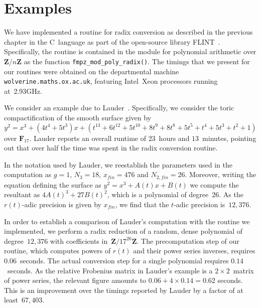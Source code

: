 
\chapter{Examples}

We have implemented a routine for radix conversion as described 
in the previous chapter in the C~language as part of the open-source 
library FLINT~\citep{FLINT}.  Specifically, the routine is contained 
in the module for polynomial arithmetic over $\mathbf{Z}/n\mathbf{Z}$ 
as the function {\tt{fmpz\_mod\_poly\_radix()}}.  The timings that we 
present for our routines were obtained on the departmental machine 
{\tt{wolverine.maths.ox.ac.uk}}, featuring \mbox{Intel Xeon} processors 
running at~2.93GHz.

We consider an example due to Lauder~\citep[Example~9.1]{Lauder2006}.  
Specifically, we consider the toric compactification of the smooth 
surface given by 
\begin{equation*}
y^2 = x^3 + (4 t^4 + 5 t^3) x + 
    (t^{13} + 6 t^{12} + 5 t^{10} + 
    8 t^9 + 8 t^8 + 5 t^5 + t^4 + 5 t^3 + t^2 + 1)
\end{equation*}
over $\mathbf{F}_{17}$.  Lauder reports an overall runtime 
of $23$~hours and $13$~minutes, pointing out that over half the 
time was spent in the radix conversion routine.

In the notation used by Lauder, we reestablish the parameters used 
in the computation as $g = 1$, $N_3 = 18$, $x_{fin} = 476$ and 
$N_{2,fin} = 26$.  Moreover, writing the equation defining the surface 
as $y^2 = x^3 + A(t) x + B(t)$ we compute the resultant as 
$4 A(t)^3 + 27 B(t)^2$, which is a polynomial of degree~$26$.  As the 
$r(t)$-adic precision is given by $x_{fin}$, we find that the $t$-adic 
precision is~$12,376$.

In order to establish a comparison of Lauder's computation with the 
routine we implemented, we perform a radix reduction of a random, 
dense polynomial of degree~$12,376$ with coefficients 
in~$\mathbf{Z}/17^{26} \mathbf{Z}$.  The precomputation step of our 
routine, which computes powers of $r(t)$ and their power series 
inverses, requires $0.06$~seconds.  The actual conversion step for a 
single polynomial requires $0.14$~seconds.  As the relative Frobenius 
matrix in Lauder's example is a $2 \times 2$~matrix of power series, 
the relevant figure amounts to $0.06 + 4 \times 0.14 = 0.62$ seconds. 
This is an improvement over the timings reported by Lauder by a 
factor of at least~$67,403$.


